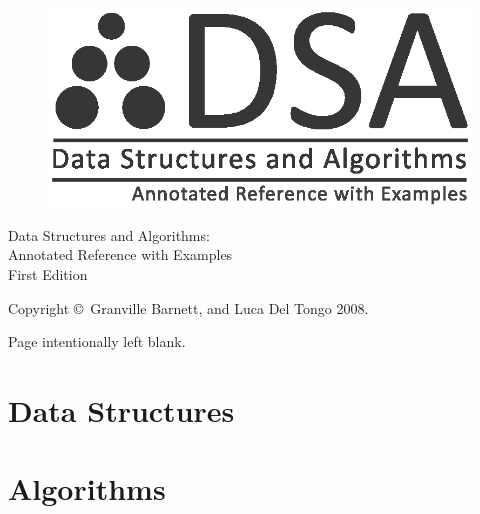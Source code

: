 \documentclass[10pt,oneside,a4paper]{report}
\begin{document}
\begin{figure}
\begin{center}
\includegraphics{dsa_logo}
\end{center}
\end{figure}
\title{}
\author{Granville Barnett\\Luca Del Tongo}
\maketitle

\pagestyle{empty}

\newpage
\begin{center}
\Large{Data Structures and Algorithms:} \\
\Large{Annotated Reference with Examples} \\
\large{First Edition}
\end{center}
\newpage

\newpage
\begin{center}
Copyright \copyright~Granville Barnett, and Luca Del Tongo 2008.
\end{center}
\newpage

\pagestyle{plain}

\newpage
\tableofcontents
\newpage

\pagestyle{headings}



\pagestyle{empty}

\newpage
\begin{center}
Page intentionally left blank.
\end{center}
\newpage

\pagestyle{headings}


\part{Data Structures}







\part{Algorithms}






\appendix


\end{document}
